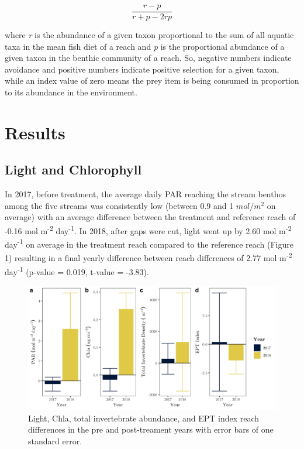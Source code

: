 \documentclass[double,12pt]{beavtex}
\begin{document}
  \begin{equation}
  \frac{r - p}{r + p - 2rp}
  \end{equation}
  
  where \emph{r} is the abundance of a given taxon proportional to the sum
  of all aquatic taxa in the mean fish diet of a reach and \emph{p} is the
  proportional abundance of a given taxon in the benthic community of a
  reach. So, negative numbers indicate avoidance and positive numbers
  indicate positive selection for a given taxon, while an index value of
  zero means the prey item is being consumed in proportion to its
  abundance in the environment.
  
  \chapter*{Results}\label{results}
  
  \section*{Light and Chlorophyll}\label{light-and-chlorophyll}
  
  In 2017, before treatment, the average daily PAR reaching the stream
  benthos among the five streams was consistently low (between 0.9 and 1
  \(mol/m^2\) on average) with an average difference between the treatment
  and reference reach of -0.16 mol m\textsuperscript{-2}
  day\textsuperscript{-1}. In 2018, after gaps were cut, light went up by
  2.60 mol m\textsuperscript{-2} day\textsuperscript{-1} on average in the
  treatment reach compared to the reference reach (Figure 1) resulting in
  a final yearly difference between reach differences of 2.77 mol
  m\textsuperscript{-2} day\textsuperscript{-1} (p-value = 0.019, t-value
  = -3.83).
  
  \begin{figure}
  
  {\centering \includegraphics[width=1\linewidth]{Figures/Vars_Reach_Diffs} 
  
  }
  
  \caption[Light, Chla, total invertebrate abundance, and EPT index reach differences in the pre and post-treament years with error bars of one standard error]{Light, Chla, total invertebrate abundance, and EPT index reach differences in the pre and post-treament years with error bars of one standard error. \label{Exp-vars}}\label{fig:unnamed-chunk-1}
  \end{figure}
  
\end{document}
